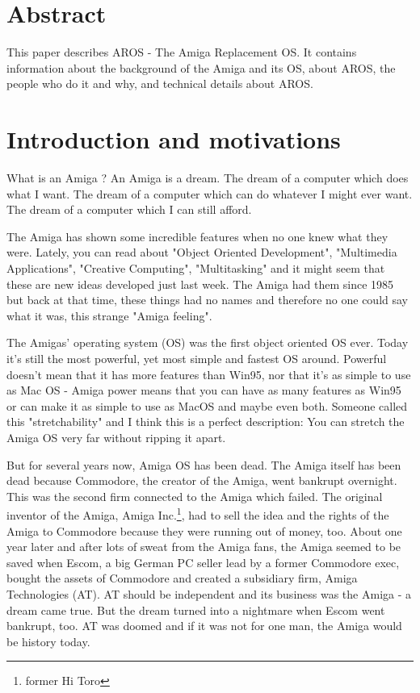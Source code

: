 \setlength{\parskip}{10pt}
\addtolength{\textheight}{2cm}
\addtolength{\textwidth}{2cm}
\addtolength{\hoffset}{-1cm}
\addtolength{\voffset}{-1cm}



\part{Abstract}

This paper describes AROS - The Amiga Replacement OS. It contains
information about the background of the Amiga and its OS, about AROS, the
people who do it and why, and technical details about AROS.

\part{Introduction and motivations}

What is an Amiga ? An Amiga is a dream. The dream of a computer which
does what I want. The dream of a computer which can do whatever I might
ever want. The dream of a computer which I can still afford.

The Amiga has shown some incredible features when no one knew what they
were. Lately, you can read about "Object Oriented Development", "Multimedia
Applications", "Creative Computing", "Multitasking" and it might seem that
these are new ideas developed just last week. The Amiga had them since 1985
but back at that time, these things had no names and therefore no one could
say what it was, this strange "Amiga feeling".

The Amigas' operating system (OS) was the first object oriented OS ever.
Today it's still the most powerful, yet most simple and fastest OS around.
Powerful doesn't mean that it has more features than Win95, nor that it's
as simple to use as Mac OS - Amiga power means that you can have as many
features as Win95 or can make it as simple to use as MacOS and maybe even
both. Someone called this "stretchability" and I think this is a perfect
description: You can stretch the Amiga OS very far without ripping it apart.

But for several years now, Amiga OS has been dead. The Amiga itself has
been dead because Commodore, the creator of the Amiga, went bankrupt
overnight. This was the second firm connected to the Amiga which failed.
The original inventor of the Amiga, Amiga Inc.\footnote{former Hi Toro},
had to sell the idea and the rights of the Amiga to Commodore because they
were running out of money, too. About one year later and after lots of
sweat from the Amiga fans, the Amiga seemed to be saved when Escom, a big
German PC seller lead by a former Commodore exec, bought the assets of
Commodore and created a subsidiary firm, Amiga Technologies (AT). AT should
be independent and its business was the Amiga - a dream came true. But the
dream turned into a nightmare when Escom went bankrupt, too. AT was doomed
and if it was not for one man, the Amiga would be history today.


